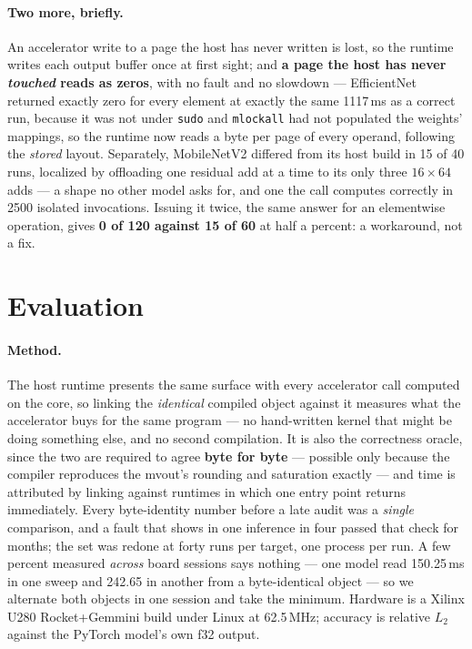 \documentclass[runningheads]{llncs}
\begin{document}
\paragraph{Two more, briefly.} An accelerator write to a page the host has never
written is lost, so the runtime writes each output buffer once at first sight;
and \textbf{a page the host has never \emph{touched} reads as zeros}, with no
fault and no slowdown --- EfficientNet returned exactly zero for every element
at exactly the same 1117\,ms as a correct run, because it was not under
\texttt{sudo} and \texttt{mlockall} had not populated the weights' mappings, so
the runtime now reads a byte per page of every operand, following the
\emph{stored} layout. Separately, MobileNetV2 differed from its host build in 15
of 40 runs, localized by offloading one residual add at a time to its only three
$16{\times}64$ adds --- a shape no other model asks for, and one the call
computes correctly in 2500 isolated invocations. Issuing it twice, the same
answer for an elementwise operation, gives \textbf{0 of 120 against 15 of 60} at
half a percent: a workaround, not a fix.

\section{Evaluation}
\label{sec:eval}

\paragraph{Method.} The host runtime presents the same surface with every accelerator call computed on
the core, so linking the \emph{identical} compiled object against it measures what
the accelerator buys for the same program --- no hand-written kernel that might be
doing something else, and no second compilation. It is also the correctness oracle, since the two are required to agree
\textbf{byte for byte} --- possible only because the compiler reproduces the
mvout's rounding and saturation exactly --- and time is attributed by linking
against runtimes in which one entry point returns immediately. Every byte-identity number before a late audit was a
\emph{single} comparison, and a fault that shows in one inference in four passed
that check for months; the set was redone at forty runs per target, one process per
run. A few percent measured \emph{across} board sessions says nothing --- one model
read 150.25\,ms in one sweep and 242.65 in another from a byte-identical object ---
so we alternate both objects in one session and take the minimum. Hardware is a
Xilinx U280 Rocket+Gemmini build under Linux at 62.5\,MHz; accuracy is relative
$L_2$ against the PyTorch model's own f32 output.
\end{document}
